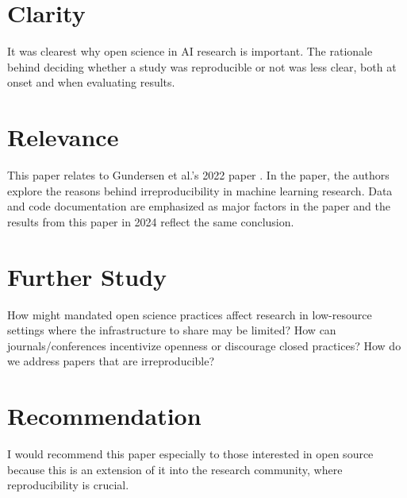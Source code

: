 \documentclass[12pt, letterpaper]{article}
\begin{document}

\section{Clarity}
\label{sec:clarity}
It was clearest why open science in AI research is important. The rationale behind deciding whether a study was reproducible or not was less clear, both at onset and when evaluating results.

\section{Relevance}
\label{sec:relevance}
This paper relates to Gundersen et al.'s 2022 paper \cite{gundersen2023sourcesirreproducibilitymachinelearning}. In the paper, the authors explore the reasons behind irreproducibility in machine learning research. Data and code documentation are emphasized as major factors in the paper and the results from this paper in 2024 reflect the same conclusion.

\section{Further Study}
\label{sec:further}
How might mandated open science practices affect research in low-resource settings where the infrastructure to share may be limited? How can journals/conferences incentivize openness or discourage closed practices? How do we address papers that are irreproducible?

\section{Recommendation}
\label{sec:rec}
I would recommend this paper especially to those interested in open source because this is an extension of it into the research community, where reproducibility is crucial.
\end{document}
